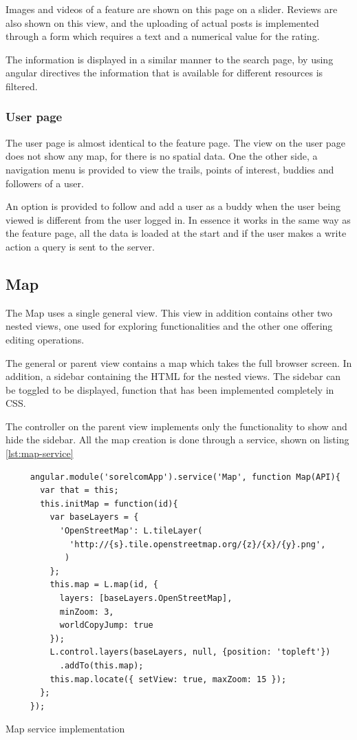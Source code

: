Images and videos of a feature are shown on this page on a slider. Reviews are also shown on this view, and the uploading of actual posts is implemented through a form which requires a text and a numerical value for the rating.

The information is displayed in a similar manner to the search page, by using angular directives the information that is available for different resources is filtered.

\subsubsection*{User page}

The user page is almost identical to the feature page. The view on the user page does not show any map, for there is no spatial data. One the other side, a navigation menu is provided to view the trails, points of interest, buddies and followers of a user.

An option is provided to follow and add a user as a buddy when the user being viewed is different from the user logged in. In essence it works in the same way as the feature page, all the data is loaded at the start and if the user makes a write action a query is sent to the server.

\subsection{Map}

The Map uses a single general view. This view in addition contains other two nested views, one used for exploring functionalities and the other one offering editing operations.

The general or parent view contains a map which takes the full browser screen. In addition, a sidebar containing the HTML for the nested views. The sidebar can be toggled to be displayed, function that has been implemented completely in CSS.

The controller on the parent view implements only the functionality to show and hide the sidebar. All the map creation is done through a service, shown on listing \ref{lst:map-service}

\begin{listing}[ht]\centering
  \begin{minipage}{.75\textwidth}
    \begin{verbatim}
     angular.module('sorelcomApp').service('Map', function Map(API){
       var that = this;
       this.initMap = function(id){
         var baseLayers = {
           'OpenStreetMap': L.tileLayer(
             'http://{s}.tile.openstreetmap.org/{z}/{x}/{y}.png',
            )
         };
         this.map = L.map(id, {
           layers: [baseLayers.OpenStreetMap],
           minZoom: 3,
           worldCopyJump: true
         });
         L.control.layers(baseLayers, null, {position: 'topleft'})
           .addTo(this.map);
         this.map.locate({ setView: true, maxZoom: 15 });
       };
     });
    \end{verbatim}
  \end{minipage}
  \caption{Map service implementation}\label{lst:map-service}
\end{listing}

